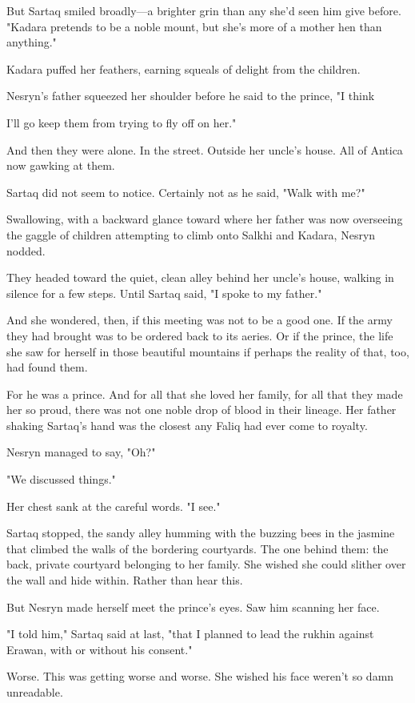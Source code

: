 But Sartaq smiled broadly---a brighter grin than any she'd seen him give before. "Kadara pretends to be a noble mount, but she's more of a mother hen than anything."

Kadara puffed her feathers, earning squeals of delight from the children.

Nesryn's father squeezed her shoulder before he said to the prince, "I think

I'll go keep them from trying to fly off on her."

And then they were alone. In the street. Outside her uncle's house. All of Antica now gawking at them.

Sartaq did not seem to notice. Certainly not as he said, "Walk with me?"

Swallowing, with a backward glance toward where her father was now overseeing the gaggle of children attempting to climb onto Salkhi and Kadara, Nesryn nodded.

They headed toward the quiet, clean alley behind her uncle's house, walking in silence for a few steps. Until Sartaq said, "I spoke to my father."

And she wondered, then, if this meeting was not to be a good one. If the army they had brought was to be ordered back to its aeries. Or if the prince, the life she saw for herself in those beautiful mountains
 if perhaps the reality of that, too, had found them.

For he was a prince. And for all that she loved her family, for all that they made her so proud, there was not one noble drop of blood in their lineage. Her father shaking Sartaq's hand was the closest any Faliq had ever come to royalty.

Nesryn managed to say, "Oh?"

"We  discussed things."

Her chest sank at the careful words. "I see."

Sartaq stopped, the sandy alley humming with the buzzing bees in the jasmine that climbed the walls of the bordering courtyards. The one behind them: the back, private courtyard belonging to her family. She wished she could slither over the wall and hide within. Rather than hear this.

But Nesryn made herself meet the prince's eyes. Saw him scanning her face.

"I told him," Sartaq said at last, "that I planned to lead the rukhin against Erawan, with or without his consent."

Worse. This was getting worse and worse. She wished his face weren't so damn unreadable.

